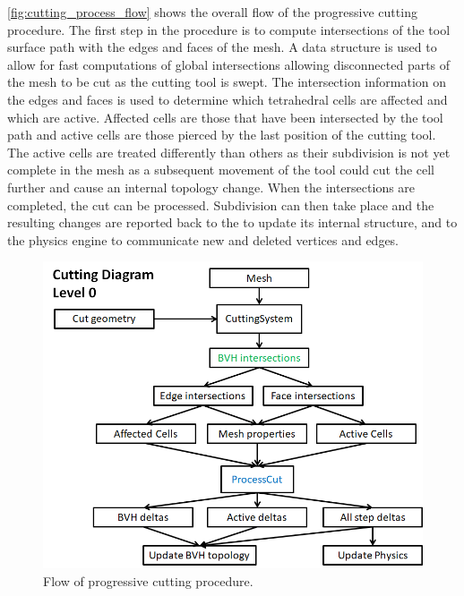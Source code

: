 \autoref{fig:cutting_process_flow} shows the overall flow of the progressive cutting procedure. The first step in the procedure is to compute intersections of the tool surface path with the edges and faces of the mesh. A  data structure is used to allow for fast computations of global intersections allowing disconnected parts of the mesh to be cut as the cutting tool is swept. The intersection information on the edges and faces is used to determine which tetrahedral cells are affected and which are active. Affected cells are those that have been intersected by the tool path and active cells are those pierced by the last position of the cutting tool. The active cells are treated differently than others as their subdivision is not yet complete in the mesh as a subsequent movement of the tool could cut the cell further and cause an internal topology change.  When the intersections are completed, the cut can be processed. Subdivision can then take place and the resulting changes are reported back to the  to update its internal structure, and to the  physics engine to communicate new and deleted vertices and edges.

\begin{figure}
  \centering%
  \includegraphics[width=0.75\linewidth]{figures/cutting/Process_cut.png}
  \caption{Flow of progressive cutting procedure.}\label{fig:cutting_process_flow}
\end{figure}



